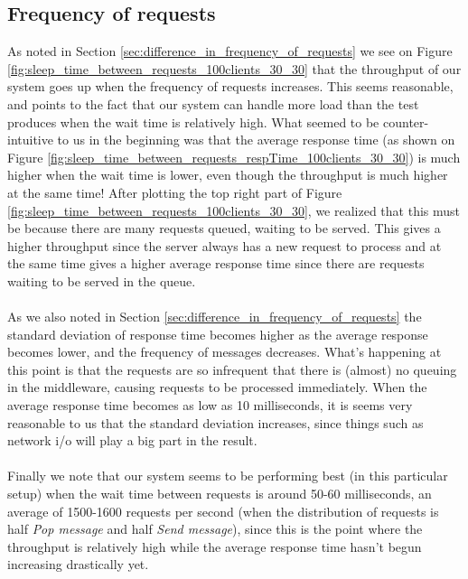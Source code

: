 \documentclass{article}
\begin{document}
\begin{table}
\begin{table}
\begin{table}
        \subsection{Frequency of requests}
            \label{sec:frequency_of_requests}
            As noted in Section \ref{sec:difference_in_frequency_of_requests} we see on Figure \ref{fig:sleep_time_between_requests_100clients_30_30} that the throughput of our system goes up when the frequency of requests increases. This seems reasonable, and points to the fact that our system can handle more load than the test produces when the wait time is relatively high. What seemed to be counter-intuitive to us in the beginning was that the average response time (as shown on Figure \ref{fig:sleep_time_between_requests_respTime_100clients_30_30}) is much higher when the wait time is lower, even though the throughput is much higher at the same time! After plotting the top right part of Figure \ref{fig:sleep_time_between_requests_100clients_30_30}, we realized that this must be because there are many requests queued, waiting to be served. This gives a higher throughput since the server always has a new request to process and at the same time gives a higher average response time since there are requests waiting to be served in the queue.\\
            \\
            As we also noted in Section \ref{sec:difference_in_frequency_of_requests} the standard deviation of response time becomes higher as the average response becomes lower, and the frequency of messages decreases. What's happening at this point is that the requests are so infrequent that there is (almost) no queuing in the middleware, causing requests to be processed immediately. When the average response time becomes as low as 10 milliseconds, it is seems very reasonable to us that the standard deviation increases, since things such as network i/o will play a big part in the result.\\
            \\
            Finally we note that our system seems to be performing best (in this particular setup) when the wait time between requests is around 50-60 milliseconds, an average of 1500-1600 requests per second (when the distribution of requests is half \textit{Pop message} and half \textit{Send message}), since this is the point where the throughput is relatively high while the average response time hasn't begun increasing drastically yet.


\end{table}
\end{table}
\end{table}
\end{document}
